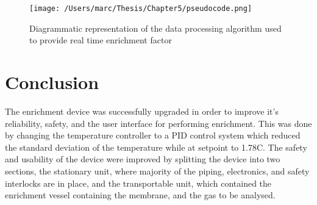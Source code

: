 \begin{figure}
    \centering
    \texttt{[image: /Users/marc/Thesis/Chapter5/pseudocode.png]}
    \caption{Diagrammatic representation of the data processing algorithm used to provide real time enrichment factor}
    \label{pseudocode}
\end{figure}

\section{Conclusion}
The enrichment device was successfully upgraded in order to improve it's reliability, safety, and the user interface for performing enrichment. This was done by changing the temperature controller to a PID control system which reduced the standard deviation of the temperature while at setpoint to 1.78\textdegree C. The safety and usability of the device were improved by splitting the device into two sections, the stationary unit, where majority of the piping, electronics, and safety interlocks are in place, and the transportable unit, which contained the enrichment vessel containing the membrane, and the gas to be analysed. 

